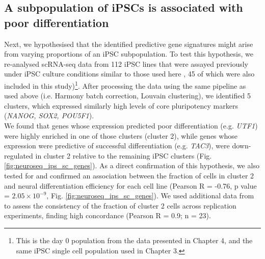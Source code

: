 \newpage

\subsection{A subpopulation of iPSCs is associated with poor differentiation}

Next, 
we hypothesised that the identified predictive gene signatures might arise from varying proportions of an iPSC subpopulation. %
To test this hypothesis, we re-analysed scRNA-seq data from 112 iPSC lines that were assayed previously under iPSC culture conditions similar to those used here
\cite{cuomo2020single}, 45 of which were also included in this study)\footnote{This is the day 0 population from the data presented in Chapter 4, and the same iPSC single cell population used in Chapter 3.}. 
After processing the data using the same pipeline as used above (i.e. Harmony batch correction, Louvain clustering),
we identified 5 clusters, 
which expressed similarly high levels of core pluripotency markers (\textit{NANOG, SOX2, POU5F1}). \\

We found that genes whose expression predicted poor differentiation (e.g. \textit{UTF1}) were highly enriched in one of those clusters (cluster 2), while genes whose expression were predictive of successful differentiation (e.g. \textit{TAC3}), were down-regulated in cluster 2 relative to the remaining iPSC clusters (Fig. \ref{fig:neuroseq_ips_sc_genes}). 
As a direct confirmation of this hypothesis, we also tested for and confirmed an association between the fraction of cells in cluster 2 and neural differentiation efficiency for each cell line (Pearson R = -0.76, p value = $2.05 \times 10^{-9}$, Fig. \ref{fig:neuroseq_ips_sc_genes}). 
We used additional data from \cite{cuomo2020single} to assess the consistency of the fraction of cluster 2 cells across replication experiments, finding high concordance (Pearson R = 0.9; n = 23).
\\

